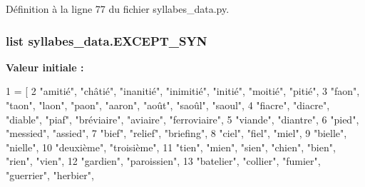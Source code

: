 Définition à la ligne 77 du fichier syllabes\+\_\+data.\+py.

\hypertarget{namespacesyllabes__data_aeedb9acbd59a6ae156c380a1a997081f}{}
\subsubsection[{E\+X\+C\+E\+P\+T\+\_\+\+S\+Y\+N}]{\setlength{\rightskip}{0pt plus 5cm}list syllabes\+\_\+data.\+E\+X\+C\+E\+P\+T\+\_\+\+S\+Y\+N}\label{namespacesyllabes__data_aeedb9acbd59a6ae156c380a1a997081f}
{\bfseries Valeur initiale \+:}
\begin{DoxyCode}
1 = [
2 \textcolor{stringliteral}{"amitié"}, \textcolor{stringliteral}{"châtié"}, \textcolor{stringliteral}{"inanitié"}, \textcolor{stringliteral}{"inimitié"}, \textcolor{stringliteral}{"initié"}, \textcolor{stringliteral}{"moitié"}, \textcolor{stringliteral}{"pitié"},
3 \textcolor{stringliteral}{"faon"}, \textcolor{stringliteral}{"taon"}, \textcolor{stringliteral}{"laon"}, \textcolor{stringliteral}{"paon"}, \textcolor{stringliteral}{"aaron"}, \textcolor{stringliteral}{"août"}, \textcolor{stringliteral}{"saoûl"}, \textcolor{stringliteral}{"saoul"},
4 \textcolor{stringliteral}{"fiacre"}, \textcolor{stringliteral}{"diacre"}, \textcolor{stringliteral}{"diable"}, \textcolor{stringliteral}{"piaf"}, \textcolor{stringliteral}{"bréviaire"}, \textcolor{stringliteral}{"aviaire"}, \textcolor{stringliteral}{"ferroviaire"},
5 \textcolor{stringliteral}{"viande"}, \textcolor{stringliteral}{"diantre"},
6 \textcolor{stringliteral}{"pied"}, \textcolor{stringliteral}{"messied"}, \textcolor{stringliteral}{"assied"},
7 \textcolor{stringliteral}{"bief"}, \textcolor{stringliteral}{"relief"}, \textcolor{stringliteral}{"briefing"},
8 \textcolor{stringliteral}{"ciel"}, \textcolor{stringliteral}{"fiel"}, \textcolor{stringliteral}{"miel"},
9 \textcolor{stringliteral}{"bielle"}, \textcolor{stringliteral}{"nielle"},
10 \textcolor{stringliteral}{"deuxième"}, \textcolor{stringliteral}{"troisième"},
11 \textcolor{stringliteral}{"tien"}, \textcolor{stringliteral}{"mien"}, \textcolor{stringliteral}{"sien"}, \textcolor{stringliteral}{"chien"}, \textcolor{stringliteral}{"bien"}, \textcolor{stringliteral}{"rien"}, \textcolor{stringliteral}{"vien"},
12 \textcolor{stringliteral}{"gardien"}, \textcolor{stringliteral}{"paroissien"},
13 \textcolor{stringliteral}{"batelier"}, \textcolor{stringliteral}{"collier"}, \textcolor{stringliteral}{"fumier"}, \textcolor{stringliteral}{"guerrier"}, \textcolor{stringliteral}{"herbier"},

\end{DoxyCode}
